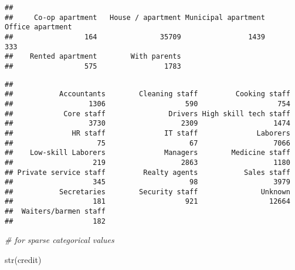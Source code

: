\documentclass[
]{article}
\newenvironment{Shaded}{\begin{snugshade}}{\end{snugshade}}
\newcommand{\CommentTok}[1]{\textcolor[rgb]{0.56,0.35,0.01}{\textit{#1}}}
\newcommand{\FunctionTok}[1]{\textcolor[rgb]{0.00,0.00,0.00}{#1}}
\newcommand{\NormalTok}[1]{#1}
\newcommand{\SpecialCharTok}[1]{\textcolor[rgb]{0.00,0.00,0.00}{#1}}
\begin{document}
\begin{Shaded}
\end{Shaded}

\begin{verbatim}
## 
##     Co-op apartment   House / apartment Municipal apartment    Office apartment 
##                 164               35709                1439                 333 
##    Rented apartment        With parents 
##                 575                1783
\end{verbatim}

\begin{Shaded}
\end{Shaded}

\begin{verbatim}
## 
##           Accountants        Cleaning staff         Cooking staff 
##                  1306                   590                   754 
##            Core staff               Drivers High skill tech staff 
##                  3730                  2309                  1474 
##              HR staff              IT staff              Laborers 
##                    75                    67                  7066 
##    Low-skill Laborers              Managers        Medicine staff 
##                   219                  2863                  1180 
## Private service staff         Realty agents           Sales staff 
##                   345                    98                  3979 
##           Secretaries        Security staff               Unknown 
##                   181                   921                 12664 
##  Waiters/barmen staff 
##                   182
\end{verbatim}

\begin{Shaded}
\begin{Highlighting}[]
\CommentTok{\# for sparse categorical values}
\end{Highlighting}
\end{Shaded}

\begin{Shaded}
\begin{Highlighting}[]
\FunctionTok{str}\NormalTok{(credit)}
\end{Highlighting}
\end{Shaded}
\end{document}
